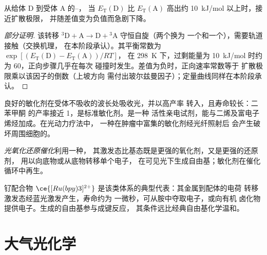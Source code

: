 \begin{proposition}[三重态转移的能量条件]\label{prop:b3:photochemistry:sensitisation-condition}
从给体 D 到受体 A 的–，
当 $E_{\mathrm T}(\mathrm D)$ 比 $E_{\mathrm T}(\mathrm A)$ 高出约 \qty{10}{kJ/mol} 以上时，接近扩散极限，
并随差值变为负值而急剧下降。
\end{proposition}

\begin{proof}[部分证明]
该转移 ${}^3\mathrm D + \mathrm A \to \mathrm D + {}^3\mathrm A$ 守恒自旋（两个换为
一个和一个），需要轨道接触（交换机理，
在本阶段承认）。其平衡常数为 $\exp[(E_{\mathrm T}(\mathrm D) - E_{\mathrm T}(\mathrm A))/RT]$，
在 \qty{298}{K} 下，过剩能量为 \qty{10}{kJ/mol} 时约为 60，正向步骤几乎在每次
碰撞时发生。差值为负时，正向速率常数等于
扩散极限乘以该因子的倒数（上坡方向
需付出玻尔兹曼因子）；定量曲线同样在本阶段承认。
\end{proof}

良好的敏化剂在受体不吸收的波长处吸收光，并以高产率
转入，且寿命较长：二苯甲酮
的产率接近 1，是标准敏化剂。是一种
活性亲电试剂，能与二烯及富电子烯烃加成。在光动力疗法中，
一种在肿瘤中富集的敏化剂经光纤照射后
会产生破坏周围细胞的。

\begin{definition}[光氧化还原催化]\label{def:b3:photochemistry:photoredox}
\emph{光氧化还原催化}利用一种，
其激发态比基态既是更强的氧化剂，又是更强的还原剂，
用以向底物或从底物转移单个电子，
在可见光下生成自由基；敏化剂在催化
循环中再生。
\end{definition}

钌配合物 $\ce{[Ru(bpy)3]^{2+}}$ 是该类体系的典型代表：其金属到配体的电荷
转移激发态经蓝光激发产生，寿命约为
一微秒，可从胺中夺取电子，或向有机
卤化物提供电子。生成的自由基参与成键反应，
其条件远比经典自由基化学温和。

\section{大气光化学}

